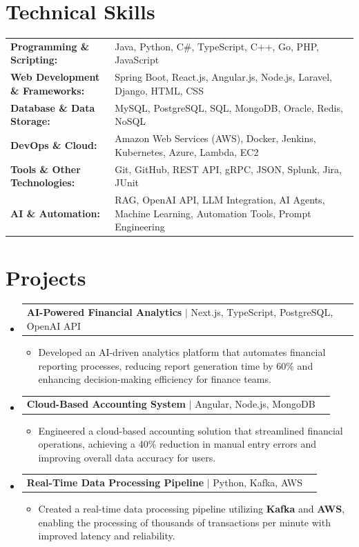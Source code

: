 \documentclass[letterpaper,10pt]{article}
\makeatletter
\newcommand{\resumeItem}[1]{
  \item{\fontsize{8pt}{9pt}\selectfont
    #1 \vspace{-3pt}
  }
}
\newcommand{\resumeProjectHeading}[2]{
    \item
    \begin{tabular*}{1.001\textwidth}{l@{\extracolsep{\fill}}r}
      \fontsize{8.5pt}{10pt}#1 & \textbf{\fontsize{8.5pt}{10pt} #2}\\
    \end{tabular*}\vspace{-7pt}
}
\newcommand{\resumeSubHeadingListStart}{\begin{itemize}[leftmargin=0pt, label={}]}
\newcommand{\resumeSubHeadingListEnd}{\end{itemize}}
\newcommand{\resumeItemListStart}{\begin{itemize}[leftmargin=*]}
\newcommand{\resumeItemListEnd}{\end{itemize}\vspace{-5pt}}
\makeatother
\begin{document}
\section{Technical Skills}
        \vspace{-14pt}
        \begin{table}[h]
            \fontsize{8pt}{9pt}\selectfont
            \begin{tabular}{p{0.3\linewidth} p{0.7\linewidth}}
                \textbf{Programming \& Scripting:} & Java, Python, C\#, TypeScript, C++, Go, PHP, JavaScript \\
                \textbf{Web Development \& Frameworks:} & Spring Boot, React.js, Angular.js, Node.js, Laravel, Django, HTML, CSS \\
                \textbf{Database \& Data Storage:} & MySQL, PostgreSQL, SQL, MongoDB, Oracle, Redis, NoSQL \\
                \textbf{DevOps \& Cloud:} & Amazon Web Services (AWS), Docker, Jenkins, Kubernetes, Azure, Lambda, EC2 \\
                \textbf{Tools \& Other Technologies:} & Git, GitHub, REST API, gRPC, JSON, Splunk, Jira, JUnit \\
                \textbf{AI \& Automation:} & RAG, OpenAI API, LLM Integration, AI Agents, Machine Learning, Automation Tools, Prompt Engineering \\
            \end{tabular}
        \end{table}
 \vspace{-18pt}

\section{Projects}
    \vspace{-5pt}
    \resumeSubHeadingListStart
          \resumeProjectHeading
            {\textbf{AI-Powered Financial Analytics} $|$ Next.js, TypeScript, PostgreSQL, OpenAI API}{}
            \resumeItemListStart
                \resumeItem{Developed an AI-driven analytics platform that automates financial reporting processes, reducing report generation time by 60\% and enhancing decision-making efficiency for finance teams.}
            \resumeItemListEnd
        \vspace{-12pt}
    
        \resumeProjectHeading
            {\textbf{Cloud-Based Accounting System} $|$ Angular, Node.js, MongoDB}{}
        \resumeItemListStart
                \resumeItem{Engineered a cloud-based accounting solution that streamlined financial operations, achieving a 40\% reduction in manual entry errors and improving overall data accuracy for users.}
        \resumeItemListEnd
      \vspace{-12pt}
      \resumeProjectHeading
        {\textbf{Real-Time Data Processing Pipeline} $|$ Python, Kafka, AWS}{}
    \resumeItemListStart
            \resumeItem{Created a real-time data processing pipeline utilizing \textbf{Kafka} and \textbf{AWS}, enabling the processing of thousands of transactions per minute with improved latency and reliability.}
    \resumeItemListEnd
    \resumeSubHeadingListEnd
\end{document}
